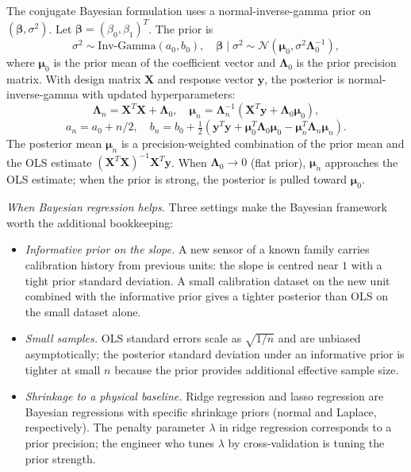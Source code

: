 The conjugate Bayesian formulation uses a normal-inverse-gamma
prior on $(\boldsymbol\beta, \sigma^{2})$. Let
$\boldsymbol\beta = (\beta_{0}, \beta_{1})^{T}$. The prior is
\[
\sigma^{2} \sim \text{Inv-Gamma}(a_{0}, b_{0}),
\quad
\boldsymbol\beta \mid \sigma^{2} \sim \mathcal{N}(\boldsymbol
\mu_{0}, \sigma^{2} \boldsymbol\Lambda_{0}^{-1}),
\]
where $\boldsymbol\mu_{0}$ is the prior mean of the coefficient
vector and $\boldsymbol\Lambda_{0}$ is the prior precision matrix.
With design matrix $\boldsymbol X$ and response vector
$\boldsymbol y$, the posterior is normal-inverse-gamma with
updated hyperparameters:
\[
\boldsymbol\Lambda_{n} = \boldsymbol X^{T} \boldsymbol X +
\boldsymbol\Lambda_{0},
\quad
\boldsymbol\mu_{n} = \boldsymbol\Lambda_{n}^{-1}(\boldsymbol X^{T}
\boldsymbol y + \boldsymbol\Lambda_{0} \boldsymbol\mu_{0}),
\]
\[
a_{n} = a_{0} + n/2,
\quad
b_{n} = b_{0} + \tfrac{1}{2}\left(\boldsymbol y^{T} \boldsymbol y
+ \boldsymbol\mu_{0}^{T} \boldsymbol\Lambda_{0} \boldsymbol\mu_{0}
- \boldsymbol\mu_{n}^{T} \boldsymbol\Lambda_{n} \boldsymbol
\mu_{n}\right).
\]
The posterior mean $\boldsymbol\mu_{n}$ is a precision-weighted
combination of the prior mean and the OLS estimate
$(\boldsymbol X^{T} \boldsymbol X)^{-1} \boldsymbol X^{T}
\boldsymbol y$. When $\boldsymbol\Lambda_{0} \to 0$ (flat prior),
$\boldsymbol\mu_{n}$ approaches the OLS estimate; when the prior
is strong, the posterior is pulled toward $\boldsymbol\mu_{0}$.

\textit{When Bayesian regression helps.} Three settings make the
Bayesian framework worth the additional bookkeeping:

\begin{itemize}[leftmargin=*]
  \item \textit{Informative prior on the slope.} A new sensor of
    a known family carries calibration history from previous
    units: the slope is centred near $1$ with a tight prior
    standard deviation. A small calibration dataset on the new
    unit combined with the informative prior gives a tighter
    posterior than OLS on the small dataset alone.
  \item \textit{Small samples.} OLS standard errors scale as
    $\sqrt{1/n}$ and are unbiased asymptotically; the posterior
    standard deviation under an informative prior is tighter at
    small $n$ because the prior provides additional effective
    sample size.
  \item \textit{Shrinkage to a physical baseline.} Ridge
    regression and lasso regression are Bayesian regressions
    with specific shrinkage priors (normal and Laplace,
    respectively). The penalty parameter $\lambda$ in ridge
    regression corresponds to a prior precision; the engineer
    who tunes $\lambda$ by cross-validation is tuning the
    prior strength.
\end{itemize}

